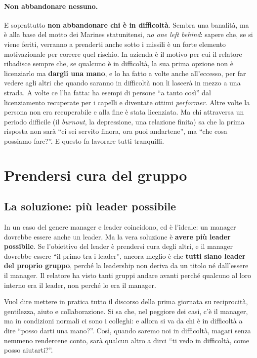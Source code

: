 \paragraph{Non abbandonare nessuno.} E soprattutto \textbf{non abbandonare chi è in difficoltà}.
Sembra una banalità, ma è alla base del motto dei Marines statunitensi, \emph{no one left behind}:
sapere che, se si viene feriti, verranno a prenderti anche sotto i missili è un forte elemento
motivazionale per correre quel rischio. In azienda è il motivo per cui il relatore ribadisce sempre
che, se qualcuno è in difficoltà, la sua prima opzione non è licenziarlo ma \textbf{dargli una mano},
e lo ha fatto a volte anche all'eccesso, per far vedere agli altri che quando saranno in difficoltà
non li lascerà in mezzo a una strada. A volte ce l'ha fatta: ha esempi di persone ``a tanto così''
dal licenziamento recuperate per i capelli e diventate ottimi \emph{performer}. Altre volte la
persona non era recuperabile e alla fine è stata licenziata. Ma chi attraversa un periodo difficile
(il \emph{burnout}, la depressione, una relazione finita) sa che la prima risposta non sarà ``ci sei
servito finora, ora puoi andartene'', ma ``che cosa possiamo fare?''. E questo fa lavorare tutti
tranquilli.

\section{Prendersi cura del gruppo}
\label{sec:z2-gruppo}

\subsection{La soluzione: più leader possibile}

In un caso del genere manager e leader coincidono, ed è l'ideale: un manager dovrebbe essere anche
un leader. Ma la vera soluzione è \textbf{avere più leader possibile}. Se l'obiettivo del leader è
prendersi cura degli altri, e il manager dovrebbe essere ``il primo tra i leader'', ancora meglio è
che \textbf{tutti siano leader del proprio gruppo}, perché la leadership non deriva da un titolo né
dall'essere il manager. Il relatore ha visto tanti gruppi andare avanti perché qualcuno al loro
interno era il leader, non perché lo era il manager.

Vuol dire mettere in pratica tutto il discorso della prima giornata su reciprocità, gentilezza,
aiuto e collaborazione. Si sa che, nel peggiore dei casi, c'è il manager, ma in condizioni normali ci
sono i colleghi: e allora si va da chi è in difficoltà a dire ``posso darti una mano?''. Così, quando
saremo noi in difficoltà, magari senza nemmeno rendercene conto, sarà qualcun altro a dirci ``ti vedo
in difficoltà, come posso aiutarti?''.

